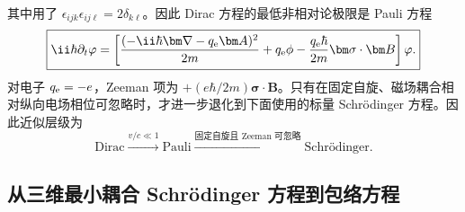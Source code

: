 其中用了 $\epsilon_{ijk}\epsilon_{ij\ell}=2\delta_{k\ell}$。因此 Dirac 方程的最低非相对论极限是 Pauli 方程
\begin{equation}
 \boxed{
 \ii\hbar\partial_t\varphi
 =\left[
 \frac{(-\ii\hbar\bm\nabla-q_{\rm e}\bm A)^2}{2m}
 +q_{\rm e}\phi
 -\frac{q_{\rm e}\hbar}{2m}\bm\sigma\cdot\bm B
 \right]\varphi.}
 \label{eq:pauli-equation}
\end{equation}
对电子 $q_{\rm e}=-e$，Zeeman 项为 $+(e\hbar/2m)\bm\sigma\cdot\bm B$。只有在固定自旋、磁场耦合相对纵向电场相位可忽略时，才进一步退化到下面使用的标量 Schr\"odinger 方程。因此近似层级为
\begin{equation}
 \boxed{
 \text{Dirac}
 \xrightarrow{v/c\ll1}\text{Pauli}
 \xrightarrow{\text{固定自旋且 Zeeman 可忽略}}
 \text{Schr\"odinger}.}
 \label{eq:dirac-pauli-sch-hierarchy}
\end{equation}


\subsection{从三维最小耦合 Schr\"odinger 方程到包络方程}

